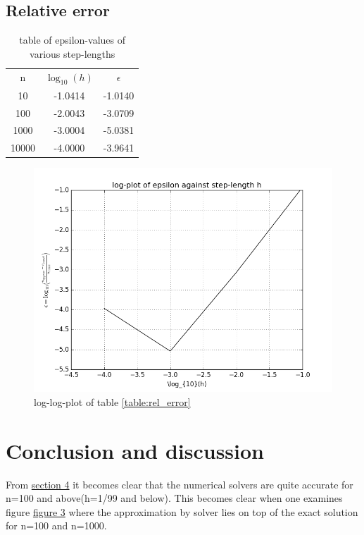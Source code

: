 \documentclass[11pt,a4paper,notitlepage]{article}
\begin{document}
\subsection{Relative error}
	\begin{table}[H]
	\centering
		\label{table:relerror}
		\begin{tabular}{|c|c|c|} \hline
			n & $\log_{10}(h)$ & $\epsilon$ \\
			10 & -1.0414 & -1.0140 \\
			100 & -2.0043 & -3.0709 \\	
			1000 & -3.0004 & -5.0381 \\
			10000 & -4.0000 & -3.9641 \\ \hline
		\end{tabular}
		\caption{table of epsilon-values of various step-lengths}
	\end{table}
	\begin{figure}[H]
		\label{fig:relerror}
		\includegraphics[scale=0.7]{../img/epsilon.png}
		\caption{log-log-plot of table \ref{table:rel_error}}
	\end{figure}
	
\section{Conclusion and discussion}
From \hyperref[section:results]{section 4} it becomes clear that the numerical solvers are quite accurate for n=100 and above(h=1/99 and below). This becomes clear when one examines figure \hyperref[fig:compare_gen_exact]{figure 3} where the approximation by solver lies on top of the exact solution for n=100 and n=1000.
	
\end{document}
